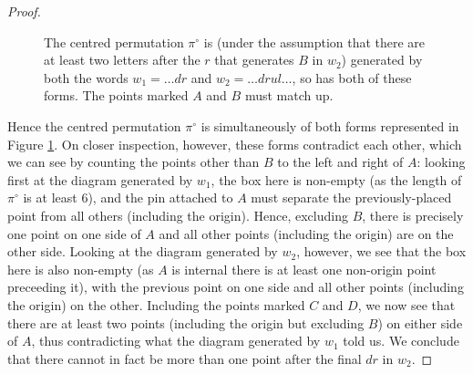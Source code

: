 \documentclass[11pt,a4paper]{article}
\newcommand{\plotptradius}{4pt}
\theoremstyle{definition}
\begin{document}
\begin{proof}
\begin{figure}[h]
\begin{center}
\end{center}
\caption{The centred permutation $\pi^{\circ}$ is (under the assumption that there are at least two letters after the $r$ that generates $B$ in $w_{2}$) generated by both the words $w_{1} = \dots dr$ and $w_{2} = \dots drul \dots$, so has both of these forms. The points marked $A$ and $B$ must match up.}
\label{vi}
\end{figure}

Hence the centred permutation $\pi^{\circ}$ is simultaneously of both forms represented in Figure \ref{vi}. On closer inspection, however, these forms contradict each other, which we can see by counting the points other than $B$ to the left and right of $A$: looking first at the diagram generated by $w_{1}$, the box here is non-empty (as the length of $\pi^{\circ}$ is at least $6$), and the pin attached to $A$ must separate the previously-placed point from all others (including the origin). Hence, excluding $B$, there is precisely one point on one side of $A$ and all other points (including the origin) are on the other side. Looking at the diagram generated by $w_{2}$, however, we see that the box here is also non-empty (as $A$ is internal there is at least one non-origin point preceeding it), with the previous point on one side and all other points (including the origin) on the other. Including the points marked $C$ and $D$, we now see that there are at least two points (including the origin but excluding $B$) on either side of $A$, thus contradicting what the diagram generated by $w_{1}$ told us. We conclude that there cannot in fact be more than one point after the final $dr$ in $w_{2}$.


\end{proof}
\end{document}
